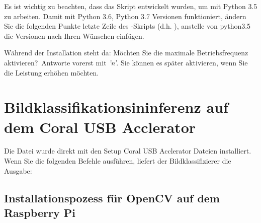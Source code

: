 \medskip







\medskip


Es ist wichtig zu beachten, dass das Skript  entwickelt 
wurden, um mit Python 3.5 zu arbeiten. Damit  mit 
Python 3.6, Python 3.7 Versionen funktioniert, ändern Sie die folgenden Punkte 
letzte Zeile des -Skripts (d.h. ), 
anstelle von python3.5 die Versionen nach Ihren Wünschen einfügen.

\medskip

Während der Installation steht da: \glqq Möchten Sie die maximale Betriebsfrequenz aktivieren?\grqq\, Antworte vorerst mit \textsl{'n'}. Sie können es später aktivieren, wenn Sie die Leistung erhöhen möchten.

\section{Bildklassifikationsininferenz auf dem Coral USB Acclerator}

Die Datei  wurde direkt mit den Setup Coral USB Acclerator Dateien installiert.
Wenn Sie die folgenden Befehle ausführen, liefert der Bildklassifizierer die Ausgabe: 

\medskip








\medskip

\subsection{Installationspozess für OpenCV auf dem Raspberry Pi}



